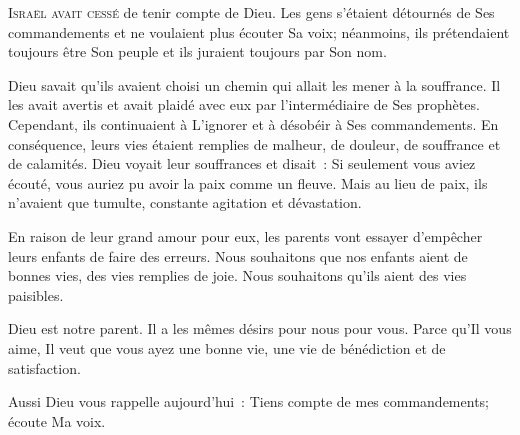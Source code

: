 
\lettrine{I}{sraël avait cessé} de tenir compte de Dieu.
 Les gens s'étaient détournés de Ses commandements
 et ne voulaient plus écouter Sa voix; néanmoins, 
 ils prétendaient toujours être Son peuple
 et ils juraient toujours par Son nom. 

Dieu savait qu'ils avaient choisi un chemin
 qui allait les mener à la souffrance.
 Il les avait avertis et avait plaidé avec eux
 par l'intermédiaire de Ses prophètes.
 Cependant, ils continuaient à L'ignorer et à désobéir
 à Ses commandements. En conséquence,
 leurs vies étaient remplies de malheur, de douleur,
 de souffrance et de calamités.
 Dieu voyait leur souffrances et disait~: 
 \og Si seulement vous aviez écouté, vous auriez pu avoir la paix
 comme un fleuve. \fg{} 
 Mais au lieu de paix, ils n'avaient que tumulte,
 constante agitation et dévastation. 


En raison de leur grand amour pour eux,
 les parents vont essayer d'empêcher leurs enfants de faire des erreurs.
 Nous souhaitons que nos enfants aient de bonnes vies,
 des vies remplies de joie.
 Nous souhaitons qu'ils 
 aient des vies paisibles. 

Dieu est notre parent. Il a les mêmes désirs pour nous \ocadr pour vous.
 Parce qu'Il vous aime, Il veut que vous ayez une bonne vie,
 une vie de bénédiction et de satisfaction. 

Aussi Dieu vous rappelle aujourd'hui~: 
 \og Tiens compte de mes commandements; écoute Ma voix. \fg{}

\dvrule








